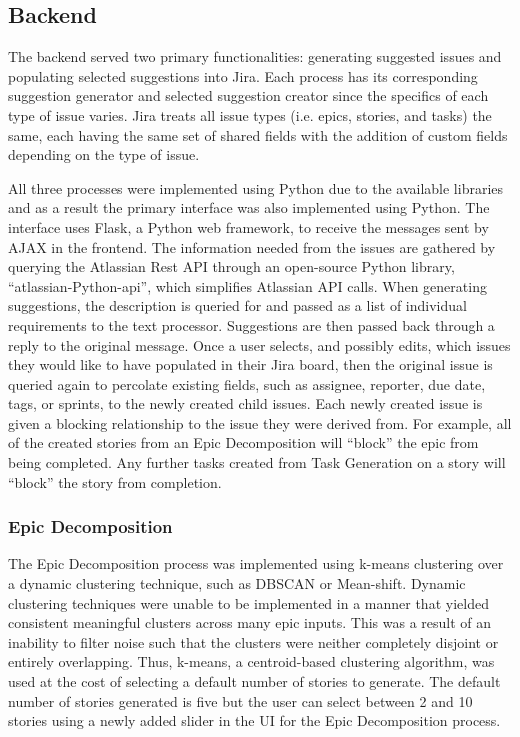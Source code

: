 \subsection{Backend}

The backend served two primary functionalities: generating suggested issues and populating selected suggestions into Jira. Each process has its corresponding suggestion generator and selected suggestion creator since the specifics of each type of issue varies. Jira treats all issue types (i.e. epics, stories, and tasks) the same, each having the same set of shared fields with the addition of custom fields depending on the type of issue.

All three processes were implemented using Python due to the available libraries and as a result the primary interface was also implemented using Python. The interface uses Flask, a Python web framework, to receive the messages sent by AJAX in the frontend. The information needed from the issues are gathered by querying the Atlassian Rest API through an open-source Python library, “atlassian-Python-api”, which simplifies Atlassian API calls. When generating suggestions, the description is queried for and passed as a list of individual requirements to the text processor. Suggestions are then passed back through a reply to the original message. Once a user selects, and possibly edits, which issues they would like to have populated in their Jira board, then the original issue is queried again to percolate existing fields, such as assignee, reporter, due date, tags, or sprints, to the newly created child issues. Each newly created issue is given a blocking relationship to the issue they were derived from. For example, all of the created stories from an Epic Decomposition will “block” the epic from being completed. Any further tasks created from Task Generation on a story will “block” the story from completion.

\subsubsection{Epic Decomposition}
The Epic Decomposition process was implemented using k-means clustering over a dynamic clustering technique, such as DBSCAN or Mean-shift. Dynamic clustering techniques were unable to be implemented in a manner that yielded consistent meaningful clusters across many epic inputs. This was a result of an inability to filter noise such that the clusters were neither completely disjoint or entirely overlapping. Thus, k-means, a centroid-based clustering algorithm, was used at the cost of selecting a default number of stories to generate. The default number of stories generated is five but the user can select between 2 and 10 stories using a newly added slider in the UI for the Epic Decomposition process.

